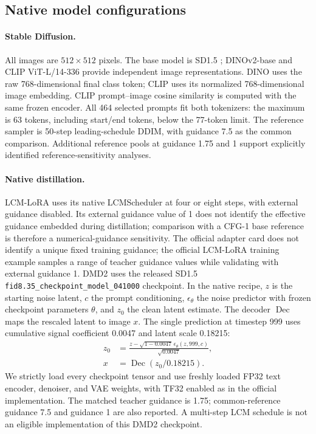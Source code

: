 \subsection{Native model configurations}
\paragraph{Stable Diffusion.}
All images are $512\!\times\!512$ pixels. The base model is SD1.5
\cite{rombach2022ldm}; DINOv2-base \cite{oquab2024dinov2} and CLIP ViT-L/14-336
\cite{radford2021clip} provide independent image representations. DINO uses the
raw 768-dimensional final class token; CLIP uses its normalized 768-dimensional
image embedding. CLIP prompt--image cosine similarity is computed with the
same frozen encoder. All 464 selected prompts fit both tokenizers: the maximum
is 63 tokens, including start/end tokens, below the 77-token limit.
The reference sampler is 50-step leading-schedule DDIM, with guidance 7.5 as the
common comparison. Additional reference pools at guidance 1.75 and 1 support
explicitly identified reference-sensitivity analyses.

\paragraph{Native distillation.}
LCM-LoRA \cite{luo2023lcmlora} uses its native LCMScheduler at four or eight
steps, with external guidance disabled. Its external guidance value of 1 does
not identify the effective guidance embedded during distillation; comparison
with a CFG-1 base reference is therefore a numerical-guidance sensitivity.
The official adapter card does not identify a unique fixed training guidance;
the official LCM-LoRA training example samples a range of teacher guidance
values while validating with external guidance 1. DMD2
\cite{yin2024dmd2} uses the released SD1.5
\texttt{fid8.35\_checkpoint\_model\_041000} checkpoint. In the native
recipe, $z$ is the starting noise latent, $c$ the prompt conditioning,
$\epsilon_\theta$ the noise predictor with frozen checkpoint parameters $\theta$,
and $z_0$ the clean
latent estimate. The decoder $\operatorname{Dec}$ maps the rescaled
latent to image $x$. The single prediction at timestep 999 uses
cumulative signal coefficient 0.0047 and latent scale 0.18215:
\begin{equation}
 \begin{aligned}
 z_0&=\frac{z-\sqrt{1-0.0047}\,\epsilon_\theta(z,999,c)}{\sqrt{0.0047}},\\
 x&=\operatorname{Dec}(z_0/0.18215).
 \end{aligned}
\label{eq:supp_dmd2_step}
\end{equation}
We strictly load every checkpoint tensor and use freshly loaded FP32 text
encoder, denoiser, and VAE weights, with TF32 enabled as in the official
implementation. The matched teacher guidance is 1.75;
common-reference guidance 7.5 and guidance 1 are also reported. A multi-step
LCM schedule is not an eligible implementation of this DMD2 checkpoint.

